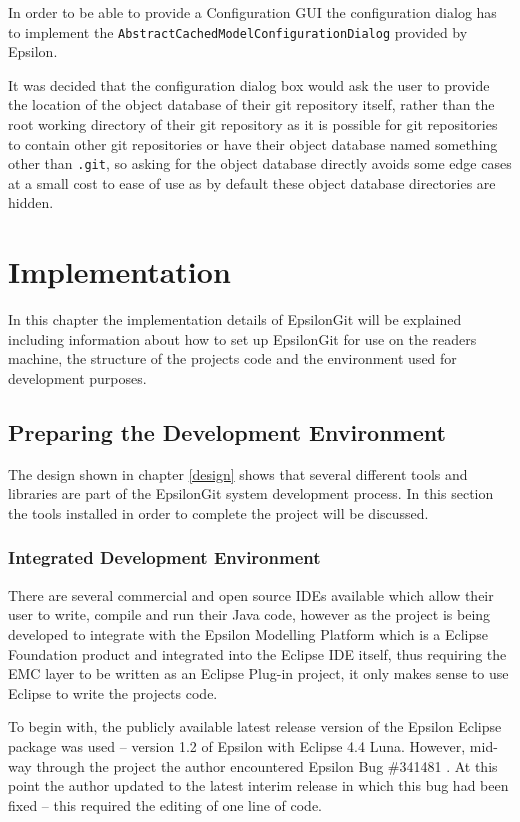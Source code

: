 \documentclass[11pt]{book}
\newcommand{\code}[1]{\texttt{#1}}
\begin{document}
In order to be able to provide a Configuration GUI the configuration dialog has to implement the \code{AbstractCachedModelConfigurationDialog} provided by Epsilon.

It was decided that the configuration dialog box would ask the user to provide the location of the object database of their git repository itself, rather than the root working directory of their git repository as it is possible for git repositories to contain other git repositories or have their object database named something other than \code{.git}, so asking for the object database directly avoids some edge cases at a small cost to ease of use as by default these object database directories are hidden.

\chapter{Implementation}
In this chapter the implementation details of EpsilonGit will be explained including information about how to set up EpsilonGit for use on the readers machine, the structure of the projects code and the environment used for development purposes.

\section{Preparing the Development Environment}
The design shown in chapter \ref{design} shows that several different tools and libraries are part of the EpsilonGit system development process. In this section the tools installed in order to complete the project will be discussed.

\subsection{Integrated Development Environment}
There are several commercial and open source IDEs available which allow their user to write, compile and run their Java code, however as the project is being developed to integrate with the Epsilon Modelling Platform which is a Eclipse Foundation product and integrated into the Eclipse IDE itself, thus requiring the EMC layer to be written as an Eclipse Plug-in project, it only makes sense to use Eclipse to write the projects code.

To begin with, the publicly available latest release version of the Epsilon Eclipse package was used -- version 1.2 of Epsilon with Eclipse 4.4 Luna. However, mid-way through the project the author encountered Epsilon Bug \#341481 \cite{epsilonbug}. At this point the author updated to the latest interim release in which this bug had been fixed -- this required the editing of one line of code. 
\end{document}
